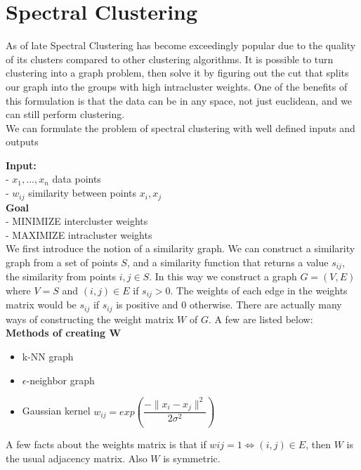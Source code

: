 {\parindent0pt
\section{Spectral Clustering}

As of late Spectral Clustering has become exceedingly popular due to the quality of its clusters compared to other clustering algorithms.   It is possible to turn clustering into a graph problem, then solve it by figuring out the cut that splits our graph into the groups with high intracluster weights. One of the benefits of this formulation is that the data can be in any space, not just euclidean, and we can still perform clustering. \\

We can formulate the problem of spectral clustering with well defined inputs and outputs

\textbf{Input:} \\
- $x_1,...,x_n$ data points\\
- $w_{ij}$ similarity between points $x_i, x_j$ \\

\textbf{Goal}\\
- MINIMIZE intercluster weights\\
- MAXIMIZE intracluster weights\\



We first introduce the notion of a similarity graph. We can construct a similarity graph from a set of points $S$, and a similarity function that returns a value $s_{ij}$, the similarity from points $i, j \in S$. In this way we construct a graph $G = (V,E)$ where $V = S$ and $(i,j) \in E$ if $s_{ij} > 0$.  The weights of each edge in the weights matrix would be $s_{ij}$ if $s_{ij}$ is positive and 0 otherwise. There are actually many ways of constructing the weight matrix $W$ of $G$. A few are listed below:\\

\textbf{Methods of creating W}
\begin{itemize}
	\item k-NN graph
	\item $\epsilon$-neighbor graph
	\item Gaussian kernel $w_{ij} = exp(\dfrac{-\lVert x_i - x_j\rVert ^2}{2 \sigma ^2})$
\end{itemize}

A few facts about the weights matrix is that if $w{ij} = 1 \Longleftrightarrow (i,j) \in E$, then $W$ is the usual adjacency matrix. Also $W$ is symmetric. \\


}
